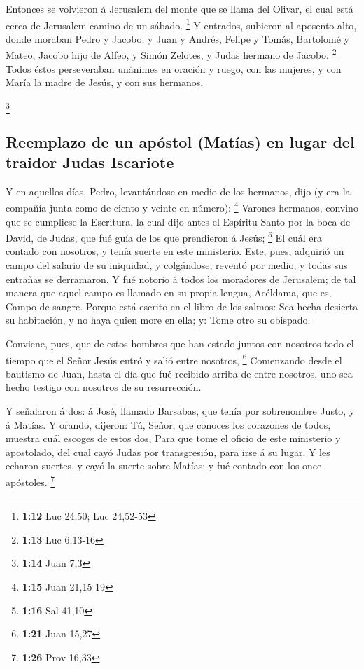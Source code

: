  Entonces se volvieron á Jerusalem del monte que se llama
del Olivar, el cual está cerca de Jerusalem camino de un sábado.
\footnote{\textbf{1:12} Luc 24,50; Luc 24,52-53}  Y
entrados, subieron al aposento alto, donde moraban Pedro y Jacobo, y
Juan y Andrés, Felipe y Tomás, Bartolomé y Mateo, Jacobo hijo de Alfeo,
y Simón Zelotes, y Judas hermano de Jacobo. \footnote{\textbf{1:13} Luc
  6,13-16}  Todos éstos perseveraban unánimes en oración y
ruego, con las mujeres, y con María la madre de Jesús, y con sus
hermanos.

\footnote{\textbf{1:14} Juan 7,3}

\hypertarget{reemplazo-de-un-apuxf3stol-matuxedas-en-lugar-del-traidor-judas-iscariote}{%
\subsection{Reemplazo de un apóstol (Matías) en lugar del traidor Judas
Iscariote}\label{reemplazo-de-un-apuxf3stol-matuxedas-en-lugar-del-traidor-judas-iscariote}}

 Y en aquellos días, Pedro, levantándose en medio de los
hermanos, dijo (y era la compañía junta como de ciento y veinte en
número): \footnote{\textbf{1:15} Juan 21,15-19}  Varones
hermanos, convino que se cumpliese la Escritura, la cual dijo antes el
Espíritu Santo por la boca de David, de Judas, que fué guía de los que
prendieron á Jesús; \footnote{\textbf{1:16} Sal 41,10}  El
cuál era contado con nosotros, y tenía suerte en este ministerio.
 Este, pues, adquirió un campo del salario de su iniquidad,
y colgándose, reventó por medio, y todas sus entrañas se derramaron.
 Y fué notorio á todos los moradores de Jerusalem; de tal
manera que aquel campo es llamado en su propia lengua, Acéldama, que es,
Campo de sangre.  Porque está escrito en el libro de los
salmos: Sea hecha desierta su habitación, y no haya quien more en ella;
y: Tome otro su obispado.

 Conviene, pues, que de estos hombres que han estado juntos
con nosotros todo el tiempo que el Señor Jesús entró y salió entre
nosotros, \footnote{\textbf{1:21} Juan 15,27}  Comenzando
desde el bautismo de Juan, hasta el día que fué recibido arriba de entre
nosotros, uno sea hecho testigo con nosotros de su resurrección.

 Y señalaron á dos: á José, llamado Barsabas, que tenía por
sobrenombre Justo, y á Matías.  Y orando, dijeron: Tú,
Señor, que conoces los corazones de todos, muestra cuál escoges de estos
dos,  Para que tome el oficio de este ministerio y
apostolado, del cual cayó Judas por transgresión, para irse á su lugar.
 Y les echaron suertes, y cayó la suerte sobre Matías; y
fué contado con los once apóstoles. \footnote{\textbf{1:26} Prov 16,33}

